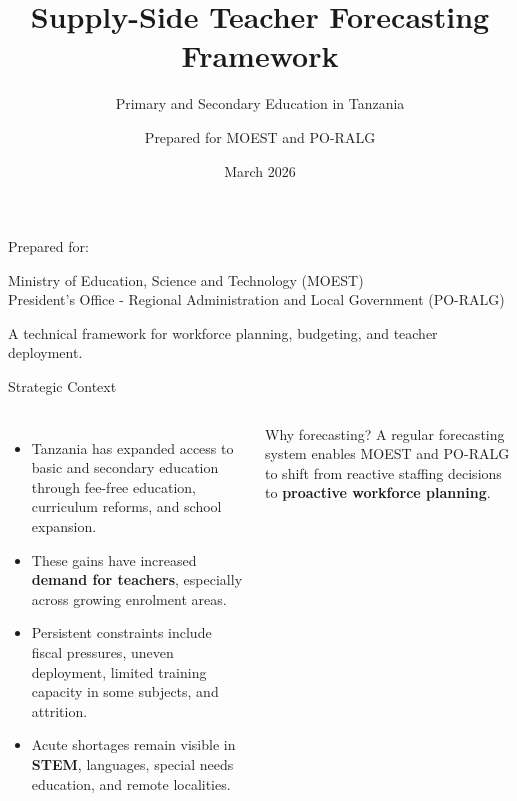 \documentclass[aspectratio=169,11pt]{beamer}
\title{Supply-Side Teacher Forecasting Framework}
\subtitle{Primary and Secondary Education in Tanzania}
\author{Prepared for MOEST and PO-RALG}
\date{March 2026}
\newcommand{\highlight}[1]{\textcolor{DavidsonBlueDark}{\textbf{#1}}}
\newcommand{\gold}[1]{\textcolor{AccentGold}{\textbf{#1}}}
\begin{document}
\begin{frame}[plain]
  \vspace{0.9cm}
  {\color{white}\inserttitle\par}
  \vspace{0.2cm}
  {\color{white!92}\insertsubtitle\par}
  \vspace{0.7cm}
  {\color{white}\large Prepared for: \par}
  \vspace{0.15cm}
  {\color{white!92}\normalsize Ministry of Education, Science and Technology (MOEST)\\
  President's Office - Regional Administration and Local Government (PO-RALG)\par}
  \vfill
  {\color{white!85}\small A technical framework for workforce planning, budgeting, and teacher deployment.\par}
  \vspace{0.35cm}
  {\color{white!80}\small \insertdate\par}
\end{frame}

\begin{frame}{Strategic Context}
\begin{columns}[T,onlytextwidth]
\begin{itemize}
  \item Tanzania has expanded access to basic and secondary education through fee-free education, curriculum reforms, and school expansion.
  \item These gains have increased \highlight{demand for teachers}, especially across growing enrolment areas.
  \item Persistent constraints include fiscal pressures, uneven deployment, limited training capacity in some subjects, and attrition.
  \item Acute shortages remain visible in \gold{STEM}, languages, special needs education, and remote localities.
\end{itemize}
\begin{block}{Why forecasting?}
\justifying
A regular forecasting system enables MOEST and PO-RALG to shift from reactive staffing decisions to \highlight{proactive workforce planning}.
\end{block}
\end{columns}
\end{frame}
\end{document}
